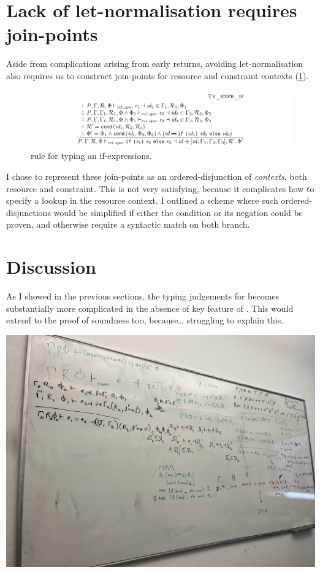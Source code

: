 \section{Lack of let-normalisation requires join-points}

Aside from complications arising from early returns, avoiding let-normalisation
also requires us to construct join-points for resource and constraint contexts
(\cref{fig:minicn-if}).

\begin{figure}[tpb]
    \ContinuedFloat{}
    \includegraphics{figures/minicn-if}
    \caption{ rule for typing an if-expressions.}\label{fig:minicn-if}
\end{figure}

I chose to represent these join-points as an ordered-disjunction of
\emph{contexts}, both resource and constraint. This is not very satisfying,
because it complicates how to specify a lookup in the resource context. I
outlined a scheme where such ordered-disjunctions would be simplified if either
the condition or its negation could be proven, and otherwise require a
syntactic match on both branch.

\section{Discussion}

As I showed in the previous sections, the typing judgements for 
becomes substantially more complicated in the absence of key feature of
. This would extend to the proof of soundness too, because\ldots
struggling to explain this.

\includegraphics{../misc/minicn-soundness}

